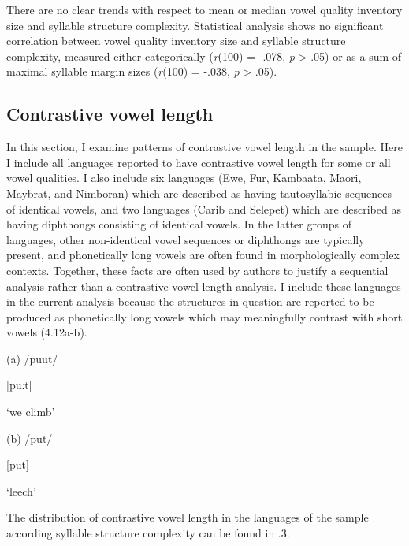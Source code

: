   There are no clear trends with respect to mean or median vowel quality inventory size and syllable structure complexity. Statistical analysis shows no significant correlation between vowel quality inventory size and syllable structure complexity, measured either categorically (\textit{r}(100) = -.078, \textit{p} > .05) or as a sum of maximal syllable margin sizes (\textit{r}(100) = -.038, \textit{p} > .05).

\subsection{Contrastive vowel length}\label{sec:4.3.2}

  In this section, I examine patterns of contrastive vowel length in the sample. Here I include all languages reported to have contrastive vowel length for some or all vowel qualities. I also include six languages (Ewe, Fur, Kambaata, Maori, Maybrat, and Nimboran) which are described as having tautosyllabic sequences of identical vowels, and two languages (Carib and Selepet) which are described as having diphthongs consisting of identical vowels. In the latter groups of languages, other non-identical vowel sequences or diphthongs are typically present, and phonetically long vowels are often found in morphologically complex contexts. Together, these facts are often used by authors to justify a sequential analysis rather than a contrastive vowel length analysis. I include these languages in the current analysis because the structures in question are reported to be produced as phonetically long vowels which may meaningfully contrast with short vowels (4.12a-b).

\ea\label{ex:(4.12)}

(a)  /puut/

  [puːt]

  ‘we climb’

(b)  /put/

  [put]

  ‘leech’

\citep[29]{Dol2007}

\z

  The distribution of contrastive vowel length in the languages of the sample according syllable structure complexity can be found in .3.

